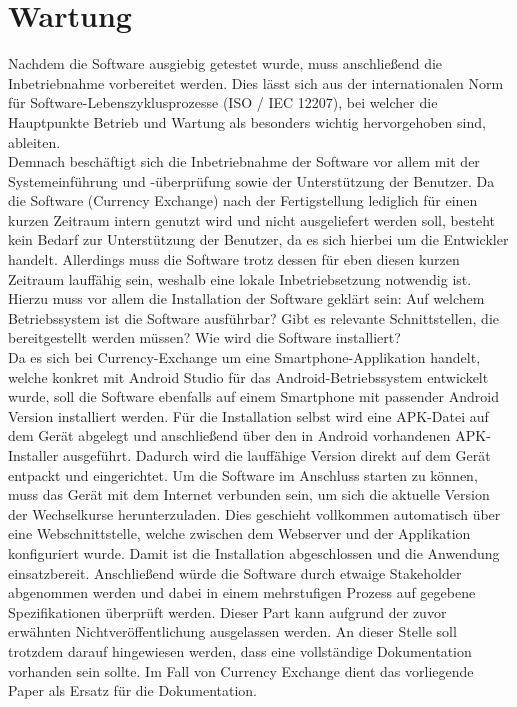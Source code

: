 \documentclass[conference]{IEEEtran}
\begin{document}
\section{Wartung}
Nachdem die Software ausgiebig getestet wurde, muss anschließend die Inbetriebnahme vorbereitet werden. Dies lässt sich aus der internationalen Norm für Software-Lebenszyklusprozesse (ISO / IEC 12207), bei welcher die Hauptpunkte Betrieb und Wartung als besonders wichtig hervorgehoben sind, ableiten.\\
Demnach beschäftigt sich die Inbetriebnahme der Software vor allem mit der Systemeinführung und -überprüfung sowie der Unterstützung der Benutzer. Da die Software (Currency Exchange) nach der Fertigstellung lediglich für einen kurzen Zeitraum intern genutzt wird und nicht ausgeliefert werden soll, besteht kein Bedarf zur Unterstützung der Benutzer, da es sich hierbei um die Entwickler handelt. Allerdings muss die Software trotz dessen für eben diesen kurzen Zeitraum lauffähig sein, weshalb eine lokale Inbetriebsetzung notwendig ist. 
Hierzu muss vor allem die Installation der Software geklärt sein:
Auf welchem Betriebssystem ist die Software ausführbar? Gibt es relevante Schnittstellen, die bereitgestellt werden müssen? Wie wird die Software installiert?\\
Da es sich bei Currency-Exchange um eine Smartphone-Applikation handelt, welche konkret mit Android Studio für das Android-Betriebssystem entwickelt wurde, soll die Software ebenfalls auf einem Smartphone mit passender Android Version installiert werden. Für die Installation selbst wird eine APK-Datei auf dem Gerät abgelegt und anschließend über den in Android vorhandenen APK-Installer ausgeführt. Dadurch wird die lauffähige Version direkt auf dem Gerät entpackt und eingerichtet. Um die Software im Anschluss starten zu können, muss das Gerät mit dem Internet verbunden sein, um sich die aktuelle Version der Wechselkurse herunterzuladen. Dies geschieht vollkommen automatisch über eine Webschnittstelle, welche zwischen dem Webserver und der Applikation konfiguriert wurde. 
Damit ist die Installation abgeschlossen und die Anwendung einsatzbereit. Anschließend würde die Software durch etwaige Stakeholder abgenommen werden und dabei in einem mehrstufigen Prozess auf gegebene Spezifikationen überprüft werden. Dieser Part kann aufgrund der zuvor erwähnten Nichtveröffentlichung ausgelassen werden. An dieser Stelle soll trotzdem darauf hingewiesen werden, dass eine vollständige Dokumentation vorhanden sein sollte. Im Fall von Currency Exchange dient das vorliegende Paper als Ersatz für die Dokumentation.
\end{document}
